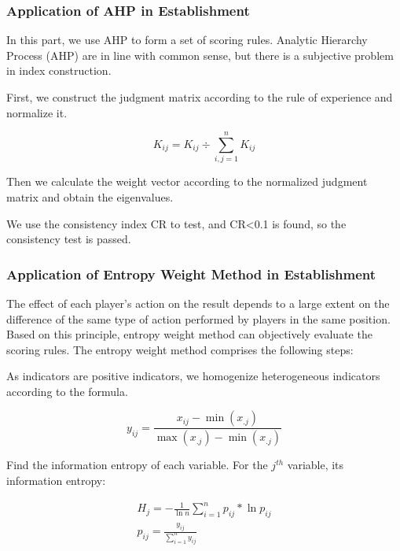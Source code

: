 \documentclass{mcmthesis}
\begin{document}
\subsubsection{Application of AHP in Establishment}
In this part, we use AHP to form a set of scoring rules. Analytic Hierarchy
Process (AHP) are in line with common sense, but there is a subjective problem in
index construction.

First, we construct the judgment matrix according to the rule of experience and
normalize it.

\begin{equation}
        K_{i j}=K_{i j} \div \sum_{i, j=1}^{n} K_{i j}
\end{equation}

Then we calculate the weight vector according to the normalized judgment
matrix and obtain the eigenvalues.

We use the consistency index CR to test, and CR<0.1 is found, so the
consistency test is passed.

\subsubsection{Application of Entropy Weight Method in Establishment}
The effect of each player's action on the result depends to a large extent on the
difference of the same type of action performed by players in the same position.
Based on this principle, entropy weight method can objectively evaluate the scoring
rules. The entropy weight method comprises the following steps:

As indicators are positive indicators, we
homogenize heterogeneous indicators according to the formula.

\begin{equation}
        y_{i j}=\frac{x_{i j}-\min \left(x_{. j}\right)}{\max \left(x_{. j}\right)-\min \left(x_{. j}\right)}
\end{equation}

Find the information entropy of each variable. For the $j^{th}$ variable, its
information entropy:

\begin{equation}
        \begin{array}{c}
                H_{j}=-\frac{1}{\ln n} \sum_{i=1}^{n} p_{i j} * \ln p_{i j} \\
                p_{i j}=\frac{y_{i j}}{\sum_{i=1}^{n} y_{i j}}
        \end{array}
\end{equation}
\end{document}
